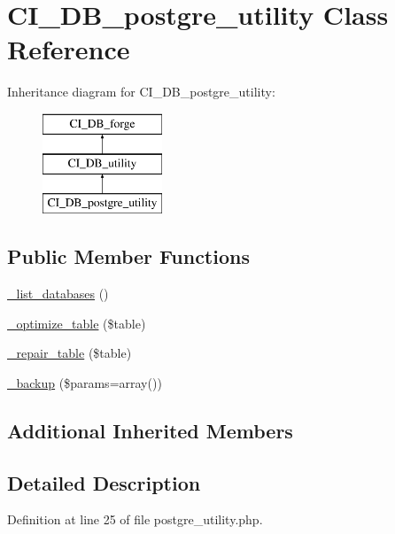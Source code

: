 \hypertarget{class_c_i___d_b__postgre__utility}{\section{C\-I\-\_\-\-D\-B\-\_\-postgre\-\_\-utility Class Reference}
\label{class_c_i___d_b__postgre__utility}
}
Inheritance diagram for C\-I\-\_\-\-D\-B\-\_\-postgre\-\_\-utility\-:\begin{figure}[H]
\begin{center}
\leavevmode
\includegraphics[height=3.000000cm]{class_c_i___d_b__postgre__utility}
\end{center}
\end{figure}
\subsection*{Public Member Functions}
\begin{DoxyCompactItemize}
\item 
\hyperlink{class_c_i___d_b__postgre__utility_aa047e69a7e732ca7280270f87f82bb3a}{\-\_\-list\-\_\-databases} ()
\item 
\hyperlink{class_c_i___d_b__postgre__utility_a4856292816fbbc8e9d927f565766727b}{\-\_\-optimize\-\_\-table} (\$table)
\item 
\hyperlink{class_c_i___d_b__postgre__utility_a7f40d4a3d78917e455e315cf708842ef}{\-\_\-repair\-\_\-table} (\$table)
\item 
\hyperlink{class_c_i___d_b__postgre__utility_a30f3053d2c82e7562349924363507afa}{\-\_\-backup} (\$params=array())
\end{DoxyCompactItemize}
\subsection*{Additional Inherited Members}


\subsection{Detailed Description}


Definition at line 25 of file postgre\-\_\-utility.\-php.




